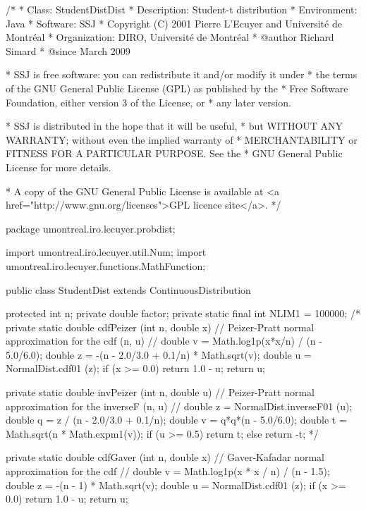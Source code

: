 \begin{code}\begin{hide}
/*
 * Class:        StudentDistDist
 * Description:  Student-t distribution
 * Environment:  Java
 * Software:     SSJ 
 * Copyright (C) 2001  Pierre L'Ecuyer and Université de Montréal
 * Organization: DIRO, Université de Montréal
 * @author       Richard Simard
 * @since        March 2009

 * SSJ is free software: you can redistribute it and/or modify it under
 * the terms of the GNU General Public License (GPL) as published by the
 * Free Software Foundation, either version 3 of the License, or
 * any later version.

 * SSJ is distributed in the hope that it will be useful,
 * but WITHOUT ANY WARRANTY; without even the implied warranty of
 * MERCHANTABILITY or FITNESS FOR A PARTICULAR PURPOSE.  See the
 * GNU General Public License for more details.

 * A copy of the GNU General Public License is available at
   <a href="http://www.gnu.org/licenses">GPL licence site</a>.
 */
\end{hide}
package umontreal.iro.lecuyer.probdist;
\begin{hide}
import umontreal.iro.lecuyer.util.Num;
import umontreal.iro.lecuyer.functions.MathFunction;
\end{hide}

public class StudentDist extends ContinuousDistribution\begin{hide} {
   protected int n;
   private double factor;
   private static final int NLIM1 = 100000;
/*
   private static double cdfPeizer (int n, double x) {
      // Peizer-Pratt normal approximation for the cdf (n, u)
      // \cite{tPEI68a}
      double v = Math.log1p(x*x/n) / (n - 5.0/6.0);
      double z = -(n - 2.0/3.0 + 0.1/n) * Math.sqrt(v);
      double u = NormalDist.cdf01 (z);
      if (x >= 0.0)
         return 1.0 - u;
      return u;
   }

   private static double invPeizer (int n, double u) {
      // Peizer-Pratt normal approximation for the inverseF (n, u)
      // \cite{tPEI68a}
      double z = NormalDist.inverseF01 (u);
      double q = z / (n - 2.0/3.0 + 0.1/n);
      double v = q*q*(n - 5.0/6.0);
      double t = Math.sqrt(n * Math.expm1(v));
      if (u >= 0.5)
         return t;
      else
         return -t;
   }
*/

   private static double cdfGaver (int n, double x) {
      // Gaver-Kafadar normal approximation for the cdf
      // \cite{tGAV84a}
      double v = Math.log1p(x * x / n) / (n - 1.5);
      double z = -(n - 1) * Math.sqrt(v);
      double u = NormalDist.cdf01 (z);
      if (x >= 0.0)
         return 1.0 - u;
      return u;
   }


}
\end{hide}
\end{code}
